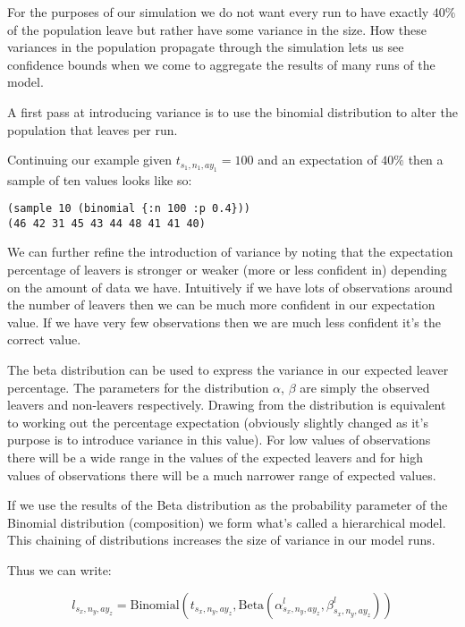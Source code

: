 \documentclass[margin=5mm]{article}
\begin{document}
For the purposes of our simulation we do not want every run to have
exactly $40\%$ of the population leave but rather have some variance
in the size.  How these variances in the population propagate through
the simulation lets us see confidence bounds when we come to
aggregate the results of many runs of the model.

A first pass at introducing variance is to use the binomial
distribution to alter the population that leaves per run.

Continuing our example given $t_{s_1,n_1,ay_1} = 100$ and an
expectation of $40\%$ then a sample of ten values looks like so:

\begin{lstlisting}
(sample 10 (binomial {:n 100 :p 0.4}))
(46 42 31 45 43 44 48 41 41 40)
\end{lstlisting}

We can further refine the introduction of variance by noting that the
expectation percentage of leavers is stronger or weaker (more or less
confident in) depending on the amount of data we have.  Intuitively if
we have lots of observations around the number of leavers then we can
be much more confident in our expectation value.  If we have very few
observations then we are much less confident it's the correct value.

The beta distribution can be used to express the variance in our
expected leaver percentage.  The parameters for the distribution
$\alpha$, $\beta$ are simply the observed leavers and non-leavers
respectively.  Drawing from the distribution is equivalent to working
out the percentage expectation (obviously slightly changed as it's
purpose is to introduce variance in this value).  For low values of
observations there will be a wide range in the values of the expected
leavers and for high values of observations there will be a much
narrower range of expected values.

If we use the results of the Beta distribution as the probability
parameter of the Binomial distribution (composition) we form what's
called a hierarchical model.  This chaining of distributions increases
the size of variance in our model runs.

Thus we can write:

\begin{equation*}
l_{s_x,n_y,ay_z} = \text{Binomial}(t_{s_x,n_y,ay_z},
\text{Beta}(\alpha^l_{s_x,n_y,ay_z}, \beta^l_{s_x,n_y,ay_z}))
\end{equation*}
\end{document}
